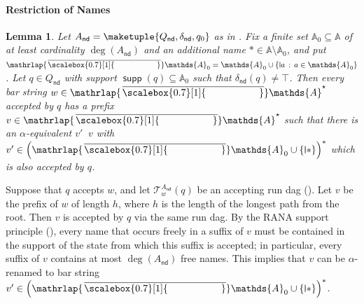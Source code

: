 \documentclass[10pt,a4paper]{amsart}
\newtheorem{lem}[theo]{Lemma}
\theoremstyle{definition}
\newcommand{\seq}{\subseteq}
\newcommand{\At}{\mathds{A}}
\newcommand{\barAs}{\barNames^{\star}}
\newcommand{\op}[1]{\operatorname{\mathsf{#1}}}
\newcommand{\nd}{\op{nd}}
\newcommand{\runtree}[3]{\mathcal{T}_{#1}^{#2}(#3)}
\DeclareMathOperator{\supp}{\mathsf{supp}}
\newcommand{\names}{\At}
\newcommand{\set}[1]{\{#1\}}
\newcommand{\setw}[2]{\{#1\,:\,#2\}}
\DeclareMathOperator{\alphaequiv}{\equiv_{\alpha}}
\newcommand{\mybar}[3]{%
  \mathrlap{\hspace{#2}\overline{\scalebox{#1}[1]{\phantom{\ensuremath{#3}}}}}\ensuremath{#3}
}
\newcommand{\barNames}{{\mybar{0.7}{1.25pt}{\names}}}
\newcommand{\midmid}{\hspace{0.2ex}{\rule[-0.1ex]{0.6pt}{1.65ex}}\hspace{0.2ex}}
\newcommand{\newletter}[1]{{\midmid}#1}
\let\originalleft\left
\let\originalright\right
\renewcommand{\left}{\mathopen{}\mathclose\bgroup\originalleft}
\renewcommand{\right}{\aftergroup\egroup\originalright}
\begin{document}
\paragraph*{Restriction of Names}

\begin{lem}\label{lem:restrNames}
  Let $A_{\nd} = \maketuple{Q_{\nd}, \delta_{\nd}, q_0}$ as in . Fix a finite set $\names_0\seq \names$ of at least cardinality $\deg(A_{\nd})$ and an additional name
  $\ast \in \names\setminus\names_0$, and put  $\barNames_0 =
  \names_0 \cup \setw{\newletter{a}}{a \in \names_0}$. Let $q \in Q_{\nd}$ with support $\supp(q) \seq
  \names_0$ such that $\delta_{\nd}(q)\neq\top$. Then every bar string $w \in \barAs$ accepted
  by $q$ has a prefix $v \in \barAs$
  such that there is an $\alpha$-equivalent $v' \alphaequiv v$ with $v' \in \left(\barNames_0
  \cup \set{\newletter{\ast}}\right)^*$ which is also accepted by $q$.
\end{lem}
\begin{IEEEproof}
Suppose that $q$ accepts $w$, and let $\runtree{w}{A_{\nd}}{q}$ be an accepting run dag (). 
Let $v$ be the prefix of $w$ of length $h$, where $h$ is the length of the longest path from the root. Then $v$ is accepted by $q$ via the same run dag. By the RANA support principle (), every name that occurs freely in a suffix of $v$ must be contained in the support of the state from which this suffix is accepted; in particular, every suffix of $v$ contains at most $\deg(A_{\nd})$ free names. This implies that $v$ can be $\alpha$-renamed to bar string $v'\in \left(\barNames_0
  \cup \set{\newletter{\ast}}\right)^*$.
\end{IEEEproof}
\end{document}
